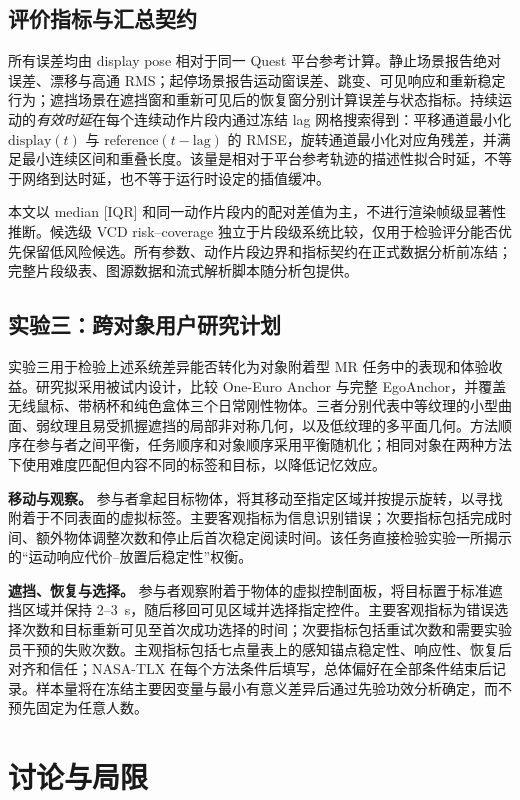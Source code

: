 \documentclass[9pt,twocolumn,letterpaper]{extarticle}
\begin{document}
\subsection{评价指标与汇总契约}

所有误差均由 display pose 相对于同一 Quest 平台参考计算。静止场景报告绝对误差、漂移与高通 RMS；起停场景报告运动窗误差、跳变、可见响应和重新稳定行为；遮挡场景在遮挡窗和重新可见后的恢复窗分别计算误差与状态指标。持续运动的\emph{有效时延}在每个连续动作片段内通过冻结 lag 网格搜索得到：平移通道最小化 $\mathrm{display}(t)$ 与 $\mathrm{reference}(t-\mathrm{lag})$ 的 RMSE，旋转通道最小化对应角残差，并满足最小连续区间和重叠长度。该量是相对于平台参考轨迹的描述性拟合时延，不等于网络到达时延，也不等于运行时设定的插值缓冲。

本文以 median [IQR] 和同一动作片段内的配对差值为主，不进行渲染帧级显著性推断。候选级 VCD risk--coverage 独立于片段级系统比较，仅用于检验评分能否优先保留低风险候选。所有参数、动作片段边界和指标契约在正式数据分析前冻结；完整片段级表、图源数据和流式解析脚本随分析包提供。

\subsection{实验三：跨对象用户研究计划}

实验三用于检验上述系统差异能否转化为对象附着型 MR 任务中的表现和体验收益。研究拟采用被试内设计，比较 One-Euro Anchor 与完整 EgoAnchor，并覆盖无线鼠标、带柄杯和纯色盒体三个日常刚性物体。三者分别代表中等纹理的小型曲面、弱纹理且易受抓握遮挡的局部非对称几何，以及低纹理的多平面几何。方法顺序在参与者之间平衡，任务顺序和对象顺序采用平衡随机化；相同对象在两种方法下使用难度匹配但内容不同的标签和目标，以降低记忆效应。

\textbf{移动与观察。} 参与者拿起目标物体，将其移动至指定区域并按提示旋转，以寻找附着于不同表面的虚拟标签。主要客观指标为信息识别错误；次要指标包括完成时间、额外物体调整次数和停止后首次稳定阅读时间。该任务直接检验实验一所揭示的“运动响应代价--放置后稳定性”权衡。

\textbf{遮挡、恢复与选择。} 参与者观察附着于物体的虚拟控制面板，将目标置于标准遮挡区域并保持 2--3~s，随后移回可见区域并选择指定控件。主要客观指标为错误选择次数和目标重新可见至首次成功选择的时间；次要指标包括重试次数和需要实验员干预的失败次数。主观指标包括七点量表上的感知锚点稳定性、响应性、恢复后对齐和信任；NASA-TLX 在每个方法条件后填写，总体偏好在全部条件结束后记录。样本量将在冻结主要因变量与最小有意义差异后通过先验功效分析确定，而不预先固定为任意人数。

\section{讨论与局限}\label{sec:discussion}
\end{document}
